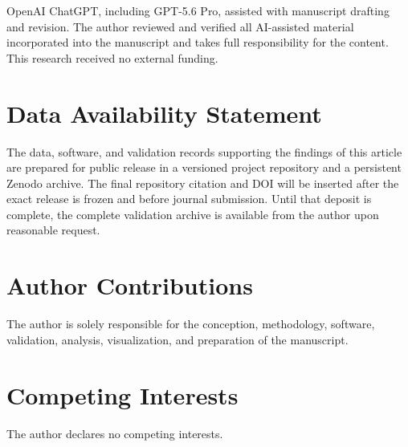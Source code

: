 \documentclass[10pt,aps,pre,reprint,floatfix,notitlepage,nofootinbib]{revtex4-2}
\begin{document}
\begin{acknowledgments}
OpenAI ChatGPT, including GPT-5.6 Pro, assisted with manuscript drafting and revision. The author reviewed and verified all AI-assisted material incorporated into the manuscript and takes full responsibility for the content. This research received no external funding.
\end{acknowledgments}

\section*{Data Availability Statement}
The data, software, and validation records supporting the findings of this article are prepared for public release in a versioned project repository and a persistent Zenodo archive. The final repository citation and DOI will be inserted after the exact release is frozen and before journal submission. Until that deposit is complete, the complete validation archive is available from the author upon reasonable request.

\section*{Author Contributions}
The author is solely responsible for the conception, methodology, software, validation, analysis, visualization, and preparation of the manuscript.

\section*{Competing Interests}
The author declares no competing interests.
\end{document}
